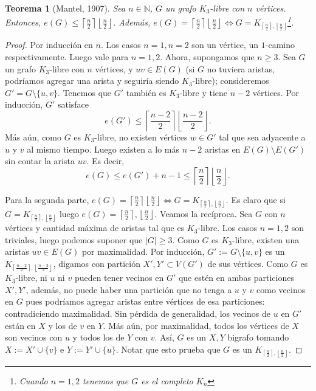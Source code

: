 \documentclass[12pt]{report}
\theoremstyle{plain}
\newtheorem{theorem}{Teorema}[section]
\theoremstyle{definition}
\newcommand{\naturals}{\mathbb{N}}
\newcommand{\abs}[1]{\left \vert #1 \right \vert}
\newcommand{\ceil}[1]{\left\lceil #1  \right\rceil}
\newcommand{\floor}[1]{\left\lfloor #1  \right\rfloor}
\begin{document}
\begin{theorem}[Mantel, 1907]
Sea $n \in \naturals$, $G$ un grafo $K_3$-libre con $n$ vértices. Entonces, $e(G) \leq \ceil{\frac n 2} \floor {\frac n 2}$. Además, $e(G) = \ceil{\frac n 2} \floor {\frac n 2} \Leftrightarrow G = K_{\ceil{\frac n 2}, \floor {\frac n 2}}$\footnote{Cuando $n = 1,2$ tenemos que $G$ es el completo $K_n$}.
\end{theorem}
\begin{proof}
Por inducción en $n$. Los casos $n = 1, n=2$ son un vértice, un $1$-camino respectivamente. Luego vale para $n=1,2$. Ahora, supongamos que $n \geq 3$. Sea $G$ un grafo $K_3$-libre con $n$ vértices, y $uv \in E(G)$ (si $G$ no tuviera aristas, podríamos agregar una arista y seguiría siendo $K_3$-libre); consideremos $G' = G \setminus \{u,v\}$. Tenemos que $G'$ también es $K_3$-libre y tiene $n-2$ vértices. Por inducción, $G'$ satisface
\[
    e(G') \leq \ceil{\frac {n-2} 2} \floor {\frac {n-2} 2}.
\]
Más aún, como $G$ es $K_3$-libre, no existen vértices $w \in G'$ tal que sea adyacente a $u$ y $v$ al mismo tiempo. Luego existen a lo más $n-2$ aristas en $E(G) \setminus E(G')$ sin contar la arista $uv$. Es decir,
\[
    e(G) \leq e(G') + n-1 \leq \ceil{\frac n 2} \floor {\frac n 2}.
\]


Para la segunda parte, $e(G) =\ceil{\frac n 2} \floor {\frac n 2} \Leftrightarrow G = K_{\ceil {\frac{n}{2}} , \floor {\frac{n}{2}}}$. Es claro que si $G = K_{\ceil{\frac n 2}, \floor {\frac n 2}}$ luego $e (G) = \ceil{\frac n 2}, \floor {\frac n 2}$. Veamos la recíproca. Sea $G$ con $n$ vértices y cantidad máxima de aristas tal que es $K_3$-libre. Los casos $n=1,2$ son triviales, luego podemos suponer que $\abs G \geq 3$. Como $G$ es $K_3$-libre, existen una aristas $uv \in E(G)$ por maximalidad. Por inducción, $G':= G \setminus \{u,v\}$ es un $K_{\ceil{\frac {n-2} 2}, \floor {\frac {n-2} 2}}$, digamos con partición $X',Y' \subset V(G')$ de sus vértices. Como $G$ es $K_3$-libre, ni $u$ ni $v$ pueden tener vecinos en $G'$ que estén en ambas particiones $X',Y'$, además, no puede haber una partición que no tenga a $u$ y $v$ como vecinos en $G$ pues podríamos agregar aristas entre vértices de esa particiones: contradiciendo maximalidad. Sin pérdida de generalidad, los vecinos de $u$ en $G'$ están en $X$ y los de $v$ en $Y$. Más aún, por maximalidad, todos los vértices de $X$ son vecinos con $u$ y todos los de $Y$ con $v$. Así, $G$ es un $X,Y$ bigrafo tomando $X := X' \cup \{v\}$ e $Y := Y' \cup \{u\}$. Notar que esto prueba que $G$ es un $K_{\ceil{\frac n 2}, \floor {\frac n 2}}$.


\end{proof}
\end{document}
